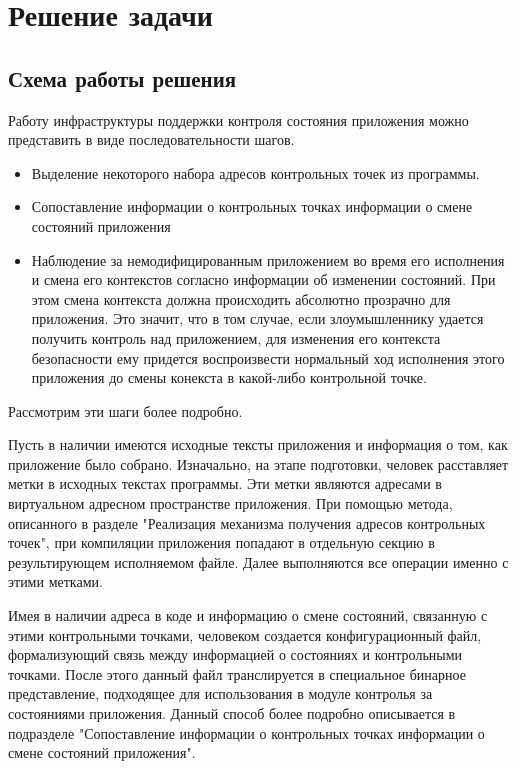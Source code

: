 
\section{Решение задачи }

\subsection{Схема работы решения}

Работу инфраструктуры поддержки 
контроля состояния приложения можно 
представить в виде последовательности шагов.
\bigskip
\begin{itemize}
\item   Выделение некоторого набора адресов 
	контрольных точек из программы. 	


\item 	Сопоставление информации о контрольных 
	точках информации о смене состояний
	приложения

\item 	Наблюдение за немодифицированным 
	приложением во время его исполнения 
	и смена его контекстов согласно 
	информации об изменении состояний.
	При этом смена контекста должна происходить
	абсолютно прозрачно для приложения. Это 
	значит, что в том случае, если злоумышленнику
	удается получить контроль над приложением, 
	для изменения его контекста безопасности 
	ему придется воспроизвести нормальный ход
	исполнения этого приложения до смены 
	конекста в какой-либо контрольной точке.  

\end{itemize}  

Рассмотрим эти шаги более подробно. 

Пусть в наличии имеются исходные 
тексты приложения и информация о том, 
как приложение было собрано. 
Изначально, на этапе подготовки, человек
расставляет метки в исходных текстах 
программы. Эти метки являются адресами в 
виртуальном адресном пространстве приложения. 
При помощью метода, описанного в разделе "Реализация 
механизма получения адресов контрольных точек", 
при компиляции приложения попадают 
в отдельную секцию в результирующем 
исполняемом файле. Далее выполняются 
все операции именно с этими метками. 

Имея в наличии адреса в коде и информацию 
о смене состояний, связанную с этими контрольными
точками, 
человеком создается конфигурационный файл, 
формализующий связь между информацией о 
состояниях и контрольными точками. После 
этого данный файл транслируется в специальное 
бинарное представление, подходящее для использования
в модуле контролья за состояниями приложения. Данный 
способ более подробно описывается в подразделе 
"Сопоставление информации о контрольных точках 
информации о смене состояний приложения". 

